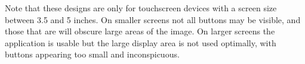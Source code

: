 \documentclass[a4paper,11pt]{article}
\begin{document}
Note that these designs are only for touchscreen devices with a screen size between 3.5 and 5 inches.  On smaller screens not all buttons may be visible, and those that are will obscure large areas of the image.  On larger screens the application is usable but the large display area is not used optimally, with buttons appearing too small and inconspicuous.


\end{document}
